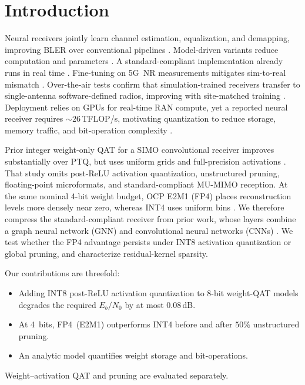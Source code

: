 \section{Introduction}
\label{sec:intro}
Neural receivers jointly learn channel estimation, equalization, and
demapping, improving \gls{BLER} over conventional pipelines
\cite{scamnrx,deeprx_mimo_icc}. Model-driven variants reduce
computation and parameters \cite{mahdi_mdx}. A standard-compliant
implementation already runs in real time \cite{wiesmayr2024design}.
Fine-tuning on 5G~NR measurements mitigates sim-to-real mismatch
\cite{nuri_reinhard_spawc}. Over-the-air tests confirm that
simulation-trained receivers transfer to single-antenna
software-defined radios, improving with site-matched training
\cite{riku_ota}. Deployment relies on \glspl{GPU} for real-time RAN
compute, yet a reported neural receiver requires
$\sim26$\,TFLOP/s, motivating quantization to reduce storage, memory traffic,
and bit-operation complexity \cite{ran_accelerated_compute_reinhard, park_simd}.

Prior integer weight-only \gls{QAT} for a \gls{SIMO} convolutional
receiver improves substantially over \gls{PTQ}, but uses uniform grids
and full-precision activations \cite{saketh_qat}. That study omits
post-\gls{ReLU} activation quantization, unstructured pruning, floating-point microformats, and standard-compliant
\gls{MU}-\gls{MIMO} reception. At the same nominal 4-bit weight
budget, OCP E2M1
(FP4) places reconstruction levels more densely near zero, whereas
INT4 uses uniform bins \cite{ocp2023mx}. We therefore compress the
standard-compliant receiver from prior work, whose layers combine a
graph neural network (GNN) and convolutional neural networks (CNNs)
\cite{scamnrx,wiesmayr2024design}. We test whether the FP4
advantage persists under INT8 activation quantization or global
pruning, and characterize residual-kernel sparsity.

Our contributions are threefold:
\begin{itemize}
  \item Adding INT8 post-\gls{ReLU} activation quantization to 8-bit
    weight-\gls{QAT} models degrades the required $E_b/N_0$ by at most
    $0.08$\,dB.
  \item At 4~bits, FP4~(E2M1) outperforms INT4 before and after $50\%$
    unstructured pruning.
  \item An analytic model quantifies weight storage and bit-operations.
\end{itemize}
Weight--activation \gls{QAT} and pruning are evaluated separately.
